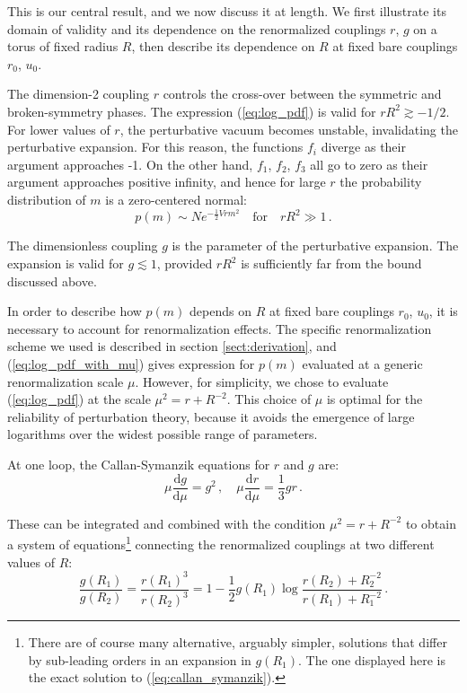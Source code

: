 \documentclass[11pt,a4paper]{article}
\newcommand{\dd}{\mathrm{d}}
\begin{document}
This is our central result, and we now discuss it at length. We first
illustrate its domain of validity and its dependence on the renormalized
couplings $r$, $g$ on a torus of fixed radius $R$, then describe its dependence
on $R$ at fixed bare couplings $r_0$, $u_0$.

The dimension-2 coupling $r$ controls the cross-over between the symmetric and
broken-symmetry phases. The expression (\ref{eq:log_pdf}) is valid for  $rR^2
\gtrsim -1/2$.  For lower values of $r$, the perturbative vacuum becomes
unstable, invalidating the perturbative expansion. For this reason, the
functions $f_i$ diverge as their argument approaches -1.  On the other hand,
$f_1$, $f_2$, $f_3$ all go to zero as their argument approaches positive
infinity, and hence for large $r$ the probability distribution of $m$ is a
zero-centered normal:
\begin{equation}
    p(m) \sim N e^{- \frac{1}{2} V r m^2}
  \quad \text{for} \quad
  rR^2 \gg 1\,.
\end{equation}

The dimensionless coupling $g$ is the parameter of the perturbative expansion.
The expansion is valid for $g \lesssim 1$, provided $rR^2$ is sufficiently far
from the bound discussed above.

In order to describe how $p(m)$ depends on $R$ at fixed bare couplings $r_0$,
$u_0$, it is necessary to account for renormalization effects. The specific
renormalization scheme we used is described in section \ref{sect:derivation},
and (\ref{eq:log_pdf_with_mu}) gives expression for $p(m)$ evaluated at a
generic renormalization scale $\mu$. However, for simplicity, we chose to
evaluate (\ref{eq:log_pdf}) at the scale $\mu^2 = r + R^{-2}$.  This choice of
$\mu$ is optimal for the reliability of perturbation theory, because it avoids
the emergence of large logarithms over the widest possible range of parameters.

At one loop, the Callan-Symanzik equations for $r$ and $g$ are:
\begin{equation}
  \label{eq:callan_symanzik}
  \mu \frac{\dd g}{\dd \mu} = g^2\,,\quad
  \mu \frac{\dd r}{\dd \mu} = \frac{1}{3}g r\,.
\end{equation}

These can be integrated and combined with the condition $\mu^2 = r + R^{-2}$ to
obtain a system of equations\footnote{There are of course many alternative,
arguably simpler, solutions that differ by sub-leading orders in an expansion in
$g(R_1)$. The one displayed here is the exact solution to
(\ref{eq:callan_symanzik}).} connecting the renormalized couplings at two
different values of $R$:
\begin{equation}
  \label{eq:renormalized_relation}
  \frac{g(R_1)}{g(R_2)} = \frac{r(R_1)^3}{r(R_2)^3} = 
  1 - \frac{1}{2} g(R_1)\log\frac{r(R_2) + R_2^{-2}}{r(R_1) + R_1^{-2}}\,.
\end{equation}
\end{document}
